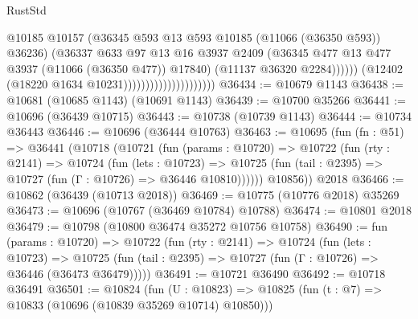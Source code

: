 \begin{lexlean}{RustStd}
\begin{coremodule}
                                                  @10185
                                                  @10157
                                                  (@36345
                                                    @593
                                                    @13
                                                    @593
                                                    @10185
                                                    (@11066 (@36350 @593))
                                                    @36236)
                                                  (@36337
                                                    @633
                                                    @97
                                                    @13
                                                    @16
                                                    @3937
                                                    @2409
                                                    (@36345
                                                      @477
                                                      @13
                                                      @477
                                                      @3937
                                                      (@11066 (@36350 @477))
                                                      @17840)
                                                    (@11137 @36320 @2284))))))
                                          (@12402 (@18220 @1634 @10231)))))))))))))))))))))
@36434 := @10679 @1143
@36438 := @10681 (@10685 @1143) (@10691 @1143)
@36439 := @10700 @35266
@36441 := @10696 (@36439 @10715)
@36443 := @10738 (@10739 @1143)
@36444 := @10734 @36443
@36446 := @10696 (@36444 @10763)
@36463 := @10695
    (fun (fn : @51) =>
    @36441
      (@10718
        (@10721
          (fun (params : @10720) =>
          @10722
            (fun (rty : @2141) =>
            @10724
              (fun (lets : @10723) =>
              @10725 (fun (tail : @2395) => @10727 (fun (Γ : @10726) => @36446 @10810))))))
        @10856))
    @2018
@36466 := @10862 (@36439 (@10713 @2018))
@36469 := @10775 (@10776 @2018) @35269
@36473 := @10696 (@10767 (@36469 @10784) @10788)
@36474 := @10801 @2018
@36479 := @10798 (@10800 @36474 @35272 @10756 @10758)
@36490 := fun (params : @10720) =>
  @10722
    (fun (rty : @2141) =>
    @10724
      (fun (lets : @10723) =>
      @10725 (fun (tail : @2395) => @10727 (fun (Γ : @10726) => @36446 (@36473 @36479)))))
@36491 := @10721 @36490
@36492 := @10718 @36491
@36501 := @10824
    (fun (U : @10823) => @10825 (fun (t : @7) => @10833 (@10696 (@10839 @35269 @10714) @10850)))

\end{coremodule}
\end{lexlean}
